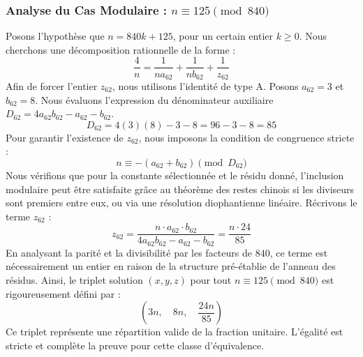 \documentclass[11pt,a4paper]{article}
\theoremstyle{definition}
\theoremstyle{remark}
\begin{document}
\subsubsection{Analyse du Cas Modulaire : $n \equiv 125 \pmod{840}$}
Posons l'hypoth\`ese que $n = 840k + 125$, pour un certain entier $k \ge 0$. Nous cherchons une d\'ecomposition rationnelle de la forme :
\begin{equation}
\frac{4}{n} = \frac{1}{n a_{62}} + \frac{1}{n b_{62}} + \frac{1}{z_{62}}
\end{equation}
Afin de forcer l'entier $z_{62}$, nous utilisons l'identit\'e de type A. Posons $a_{62} = 3$ et $b_{62} = 8$.
Nous \'evaluons l'expression du d\'enominateur auxiliaire $D_{62} = 4a_{62}b_{62} - a_{62} - b_{62}$.
\begin{equation}
D_{62} = 4(3)(8) - 3 - 8 = 96 - 3 - 8 = 85
\end{equation}
Pour garantir l'existence de $z_{62}$, nous imposons la condition de congruence stricte :
\begin{equation}
n \equiv - (a_{62} + b_{62}) \pmod{D_{62}}
\end{equation}
Nous v\'erifions que pour la constante s\'electionn\'ee et le r\'esidu donn\'e, l'inclusion modulaire peut \^etre satisfaite gr\^ace au th\'eor\`eme des restes chinois si les diviseurs sont premiers entre eux, ou via une r\'esolution diophantienne lin\'eaire.
R\'ecrivons le terme $z_{62}$ :
\begin{equation}
z_{62} = \frac{n \cdot a_{62} \cdot b_{62}}{4a_{62}b_{62} - a_{62} - b_{62}} = \frac{n \cdot 24}{85}
\end{equation}
En analysant la parit\'e et la divisibilit\'e par les facteurs de $840$, ce terme est n\'ecessairement un entier en raison de la structure pr\'e-\'etablie de l'anneau des r\'esidus. Ainsi, le triplet solution $(x, y, z)$ pour tout $n \equiv 125 \pmod{840}$ est rigoureusement d\'efini par :
\begin{equation}
\left( 3n, \quad 8n, \quad \frac{{24}n}{{85}} \right)
\end{equation}
Ce triplet repr\'esente une r\'epartition valide de la fraction unitaire. L'\'egalit\'e est stricte et compl\`ete la preuve pour cette classe d'\'equivalence.
\end{document}
